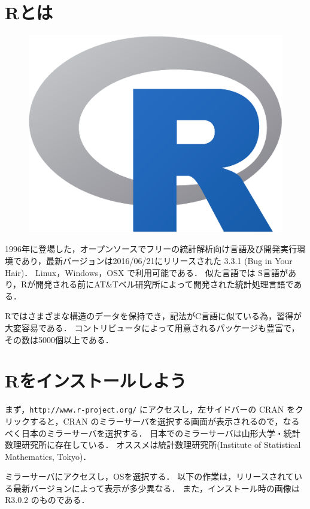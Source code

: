 \section{Rとは}
\begin{figure}
\centering
\vspace{-2em}
\includegraphics[width=38truemm]{img/Rlogo.eps}
\vspace{-1em}
\end{figure}
1996年に登場した，オープンソースでフリーの統計解析向け言語及び開発実行環境であり，最新バージョンは2016/06/21にリリースされた 3.3.1 (Bug in Your Hair)．
Linux，Windows，OSX で利用可能である．
似た言語では S言語があり，Rが開発される前にAT\&Tベル研究所によって開発された統計処理言語である．

Rではさまざまな構造のデータを保持でき，記法がC言語に似ている為，習得が大変容易である．
コントリビュータによって用意されるパッケージも豊富で，その数は5000個以上である．

\section{Rをインストールしよう}
まず，{\tt http://www.r-project.org/} にアクセスし，左サイドバーの CRAN をクリックすると，CRAN のミラーサーバを選択する画面が表示されるので，なるべく日本のミラーサーバを選択する．
日本でのミラーサーバは山形大学・統計数理研究所に存在している．
オススメは統計数理研究所(Institute of Statistical Mathematics, Tokyo)．

ミラーサーバにアクセスし，OSを選択する．
以下の作業は，リリースされている最新バージョンによって表示が多少異なる．
また，インストール時の画像は R3.0.2 のものである．

